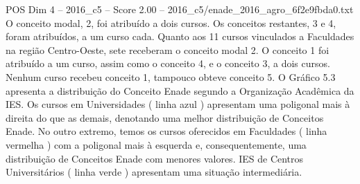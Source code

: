 \begin{textsample}{POS Dim 4 – 2016\_c5 – Score 2.00 – 2016\_c5/enade\_2016\_agro\_6f2e9fbda0.txt}
O conceito modal, 2, foi atribuído a dois cursos.
Os conceitos restantes, 3 e 4, foram atribuídos, a um curso cada.
Quanto aos 11 cursos vinculados a Faculdades na região Centro-Oeste, sete receberam o conceito modal 2.
O conceito 1 foi atribuído a um curso, assim como o conceito 4, e o conceito 3, a dois cursos.
Nenhum curso recebeu conceito 1, tampouco obteve conceito 5.
O Gráfico 5.3 apresenta a distribuição do Conceito Enade segundo a Organização Acadêmica da IES.
Os cursos em Universidades ( linha azul ) apresentam uma poligonal mais à direita do que as demais, denotando uma melhor distribuição de Conceitos Enade.
No outro extremo, temos os cursos oferecidos em Faculdades ( linha vermelha ) com a poligonal mais à esquerda e, consequentemente, uma distribuição de Conceitos Enade com menores valores.
IES de Centros Universitários ( linha verde ) apresentam uma situação intermediária.

\end{textsample}
